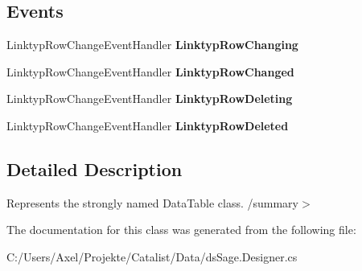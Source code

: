 \subsection*{Events}
\begin{DoxyCompactItemize}
\item 
Linktyp\+Row\+Change\+Event\+Handler {\bfseries Linktyp\+Row\+Changing}\hypertarget{class_products_1_1_data_1_1ds_sage_1_1_linktyp_data_table_a901216666c85e46d1c2b945ac5f1217b}{}\label{class_products_1_1_data_1_1ds_sage_1_1_linktyp_data_table_a901216666c85e46d1c2b945ac5f1217b}

\item 
Linktyp\+Row\+Change\+Event\+Handler {\bfseries Linktyp\+Row\+Changed}\hypertarget{class_products_1_1_data_1_1ds_sage_1_1_linktyp_data_table_ab9f6045a3861d5d44782c095423f56d4}{}\label{class_products_1_1_data_1_1ds_sage_1_1_linktyp_data_table_ab9f6045a3861d5d44782c095423f56d4}

\item 
Linktyp\+Row\+Change\+Event\+Handler {\bfseries Linktyp\+Row\+Deleting}\hypertarget{class_products_1_1_data_1_1ds_sage_1_1_linktyp_data_table_a0f0cc7f5ccefba0281d8ded52cebb601}{}\label{class_products_1_1_data_1_1ds_sage_1_1_linktyp_data_table_a0f0cc7f5ccefba0281d8ded52cebb601}

\item 
Linktyp\+Row\+Change\+Event\+Handler {\bfseries Linktyp\+Row\+Deleted}\hypertarget{class_products_1_1_data_1_1ds_sage_1_1_linktyp_data_table_a7b772f327b8e1d30c3bf3b25e48a820c}{}\label{class_products_1_1_data_1_1ds_sage_1_1_linktyp_data_table_a7b772f327b8e1d30c3bf3b25e48a820c}

\end{DoxyCompactItemize}


\subsection{Detailed Description}
Represents the strongly named Data\+Table class. /summary$>$ 

The documentation for this class was generated from the following file\+:\begin{DoxyCompactItemize}
\item 
C\+:/\+Users/\+Axel/\+Projekte/\+Catalist/\+Data/ds\+Sage.\+Designer.\+cs\end{DoxyCompactItemize}

